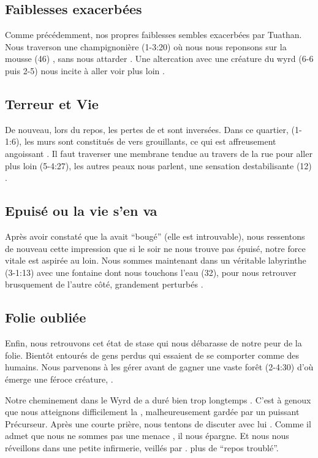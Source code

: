 \documentclass[11pt]{article}
\begin{document}
\subsection{Faiblesses exacerbées}
Comme précédemment, nos propres faiblesses sembles exacerbées par Tuathan. Nous traverson une champignonière (1-3:20) où nous nous reponsons sur la mousse (46) \gain{\nrj[1]}, sans nous attarder . Une altercation avec une créature du wyrd (6-6 puis 2-5) nous incite à aller voir plus loin .

\subsection{Terreur et Vie}
De nouveau, lors du repos, les pertes de \life{} et \terror{} sont inversées. Dans ce quartier, (1-1:6), les murs sont constitués de vers grouillants, ce qui est affreusement angoissant . Il faut traverser une membrane tendue au travers de la rue pour aller plus loin (5-4:27), les autres peaux nous parlent, une sensation destabilisante (12) .


\subsection{Epuisé ou la vie s'en va}
Après avoir constaté que la \resolutionorrin{} avait ``bougé'' (elle est introuvable), nous ressentons de nouveau cette impression que si le soir ne nous trouve pas épuisé, notre force vitale est aspirée au loin. Nous sommes maintenant dans un véritable labyrinthe (3-1:13) avec une fontaine dont nous touchons l'eau (32), pour nous retrouver brusquement de l'autre côté, grandement perturbés .

\subsection{Folie oubliée}
Enfin, nous retrouvons cet état de stase qui nous débarasse de notre peur de la folie. Bientôt entourés de gens perdus qui essaient de se comporter comme des humains. Nous parvenons à les gérer  avant de gagner une vaste forêt (2-4:30) d'où émerge une féroce créature, .

Notre cheminement dans le Wyrd de \tuathan{} a duré bien trop longtemps . C'est à genoux que nous atteignons difficilement la \valleegardiens{}, malheureusement gardée par un puissant Précurseur. Après une courte prière, nous tentons de discuter avec lui . Comme il admet que nous ne sommes pas une menace , il nous épargne. Et nous nous réveillons dans une petite infirmerie, veillés par \orrin{}.  plus de ``repos troublé''.
\end{document}
